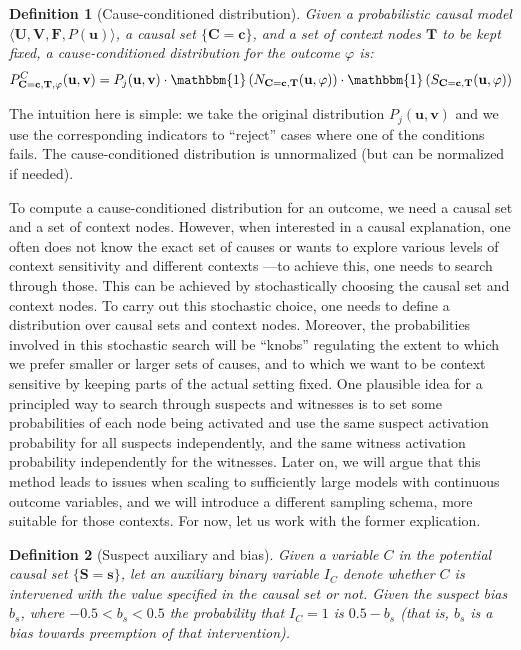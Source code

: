 \documentclass[twoside,11pt]{article}
\newtheorem{definition}{Definition}
\begin{document}
\begin{definition}[Cause-conditioned distribution]\label{def:cause-conditioned}
    Given a probabilistic causal model \(\langle \mathbf{U}, \mathbf{V}, \mathbf{F}, P(\mathbf{u}) \rangle\), a causal set \(\{\mathbf{C} = \mathbf{c}\}\), and a set of context nodes \(\mathbf{T}\) to be kept fixed, a cause-conditioned distribution for the outcome \(\varphi\) is:
    \[P^C_{\mathbf{C} = \mathbf{c}, \mathbf{T}, \varphi}(\mathbf{u}, \mathbf{v}) = P_j(\mathbf{u}, \mathbf{v}) \cdot \mathbbm{1}\left(N_{\mathbf{C} = \mathbf{c}, \mathbf{T}}(\mathbf{u}, \varphi)\right) \cdot \mathbbm{1}\left(S_{\mathbf{C} = \mathbf{c}, \mathbf{T}}(\mathbf{u}, \varphi)\right)\]
\end{definition}


\noindent The intuition here is simple: we take the original distribution $P_j(\mathbf{u}, \mathbf{v})$ and we use the corresponding indicators to ``reject'' cases where one of the conditions fails.  The cause-conditioned distribution is unnormalized (but can be normalized if needed).


To compute a cause-conditioned distribution for an outcome, we need a causal set and a set of context nodes. However, when interested in a causal explanation, one often does not know the exact set of causes or wants to explore various levels of context sensitivity and different contexts ---to achieve this, one needs to search through those. This can be achieved by stochastically choosing the causal set and context nodes. To carry out this stochastic choice, one needs to define a distribution over causal sets and context nodes. Moreover, the probabilities involved in this stochastic search will be ``knobs'' regulating the extent to which we prefer smaller or larger sets of causes, and to which we want to be context sensitive by keeping parts of the actual setting fixed.
One plausible idea for a principled way to search through suspects and witnesses is to set some probabilities of each node being activated and use the same suspect activation probability for all suspects independently, and the same witness activation probability independently for the witnesses. Later on, we will argue that this method leads to issues when scaling to sufficiently large models with continuous outcome variables, and we will introduce a different sampling schema, more suitable for those contexts. For now, let us work with the former explication.


\begin{definition}[Suspect auxiliary and bias]
    Given a variable \(C\) in the potential causal set \(\{\mathbf{S} = \mathbf{s}\}\), let an auxiliary binary variable \(I_C\) denote whether \(C\) is intervened with the value specified in the causal set or not. Given the suspect bias \(b_s\), where $-0.5 < b_s < 0.5$ the probability that \(I_C =1\) is \(0.5 - b_s\) (that is, $b_s$ is a bias towards preemption of that intervention).
    
\end{definition}
\end{document}
